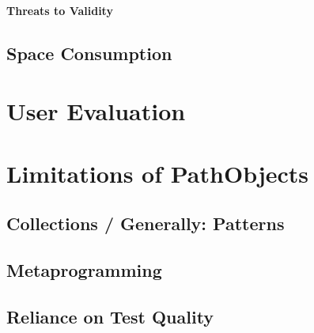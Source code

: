 \paragraph{Threats to Validity}

\subsection{Space Consumption}
\label{s:space-consumption}

\section{User Evaluation}

\section{Limitations of PathObjects}
\subsection{Collections / Generally: Patterns}
\subsection{Metaprogramming}
\subsection{Reliance on Test Quality}